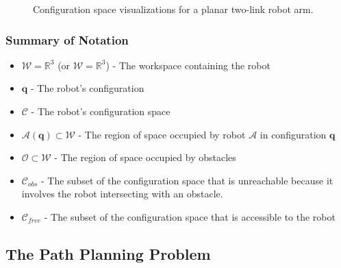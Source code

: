 \begin{figure}
\begin{center}
  \end{center}
  \caption{Configuration space visualizations for a planar two-link
    robot arm.}
  \label{fig:arm}
\end{figure}





\subsubsection*{Summary of Notation}

\begin{itemize}
  \item $\mathcal{W}=\mathbb{R}^3$ (or $\mathcal{W}=\mathbb{R}^3$) -
    The workspace containing the robot
  \item $\mathbf{q}$ - The robot's configuration
  \item $\mathcal{C}$ - The robot's configuration space
  \item $\mathcal{A}(\mathbf{q}) \subset \mathcal{W}$ - The region of space
    occupied by robot $\mathcal{A}$ in configuration $\mathbf{q}$
  \item $\mathcal{O} \subset \mathcal{W}$ - The region of space
    occupied by obstacles
  \item $\mathcal{C}_{obs}$ - The subset of the configuration space
     that is unreachable because it involves the robot intersecting with an
     obstacle.
  \item $\mathcal{C}_{free}$ - The subset of the configuration space that is
    accessible to the robot
\end{itemize}


\subsection{The Path Planning Problem}



